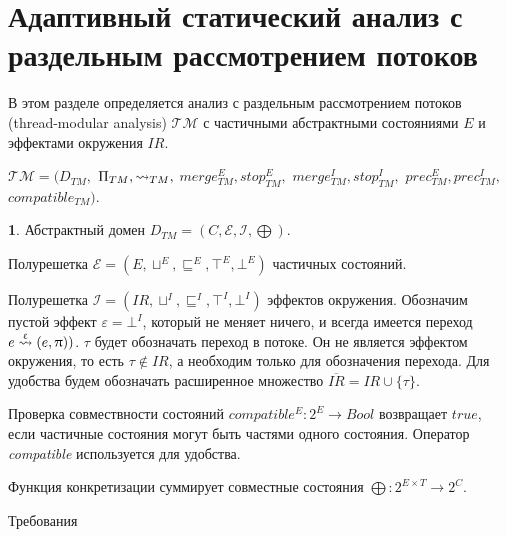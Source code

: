 \newcommand{\IR}{IR}
\newcommand{\epp}{\mathrel{\bigoplus}}
\newcommand{\conctm}[1]{\conc{#1}_{TM}}

\section{Адаптивный статический анализ с раздельным рассмотрением потоков}
\label{sect_tm_with_io}

В этом разделе определяется анализ с раздельным рассмотрением потоков (thread-modular analysis) $\mathcal{TM}$ с частичными абстрактными состояниями $E$ и эффектами окружения $\IR$.

$\mathcal{TM}=(D_{TM},$ $\Pi_{TM}, \leadsto_{TM},$ $merge^E_{TM}, stop^E_{TM},$ $merge^I_{TM}, stop^I_{TM},$ $prec^E_{TM}, prec^I_{TM},$ $compatible_{TM})$.

{\textbf 1.}
Абстрактный домен $D_{TM} = (C, \mathcal{E}, \mathcal{I}, \epp)$.

Полурешетка $\mathcal{E}=(E, \sqcup^E, \sqsubseteq^E, \top^E, \bot^E)$ частичных состояний.

Полурешетка 
$\mathcal{I}=(\IR, \sqcup^I, \sqsubseteq^I, \top^I, \bot^I)$ эффектов окружения.
Обозначим пустой эффект $\varepsilon=\bot^I$, который не меняет ничего, и всегда имеется переход $e \stackrel{\upvarepsilon}{\leadsto} (e, \uppi))$.
$\tau$ будет обозначать переход в потоке.
Он не является эффектом окружения, то есть $\tau \notin IR$, а необходим только для обозначения перехода.
Для удобства будем обозначать расширенное множество $\overline{IR} = \IR \cup \{\tau\}$.

Проверка совмествности состояний $compatible^E: 2^E \to Bool$ возвращает $true$, если частичные состояния могут быть частями одного состояния.
Оператор \emph{compatible} используется для удобства.

Функция конкретизации суммирует совместные состояния
$\epp: 2^{E \times T} \to 2^C$.

Требования

